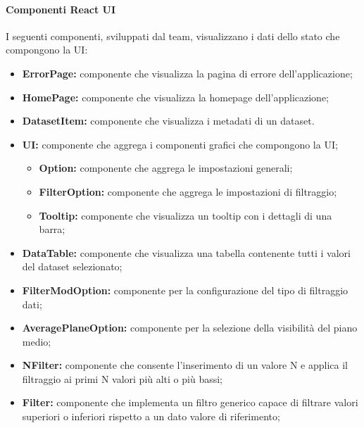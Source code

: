 \paragraph{Componenti React UI}
    I seguenti componenti, sviluppati dal team, visualizzano i dati dello stato che compongono la UI:
    \begin{itemize}
        \item \textbf{ErrorPage:} componente che visualizza la pagina di errore dell'applicazione;
        \item \textbf{HomePage:} componente che visualizza la homepage dell'applicazione;
        \item \textbf{DatasetItem:} componente che visualizza i metadati di un dataset.
        \item \textbf{UI:} componente che aggrega i componenti grafici che compongono la UI;
            \begin{itemize}
                \item \textbf{Option:} componente che aggrega le impostazioni generali;
                \item \textbf{FilterOption:} componente che aggrega le impostazioni di filtraggio;
                \item \textbf{Tooltip:} componente che visualizza un tooltip con i dettagli di una barra;
            \end{itemize}
        \item \textbf{DataTable:} componente che visualizza una tabella contenente tutti i valori del dataset selezionato;
        \item \textbf{FilterModOption:} componente per la configurazione del tipo di filtraggio dati;
        \item \textbf{AveragePlaneOption:} componente per la selezione della visibilità del piano medio;
        \item \textbf{NFilter:} componente che consente l'inserimento di un valore N e applica il filtraggio ai primi N valori più alti o più bassi;
        \item \textbf{Filter:} componente che implementa un filtro generico capace di filtrare valori superiori o inferiori rispetto a un dato valore di riferimento;
    \end{itemize}
